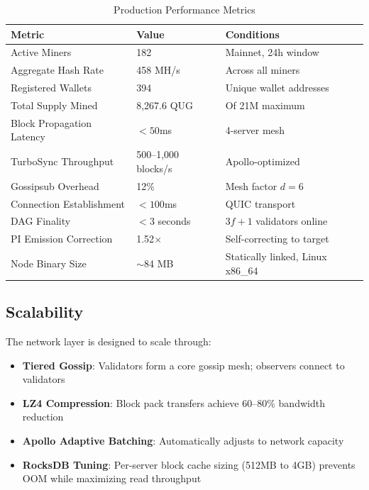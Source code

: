 \documentclass[11pt,a4paper]{article}
\begin{document}
\begin{table}[H]
\centering
\begin{tabular}{lll}
\toprule
\textbf{Metric} & \textbf{Value} & \textbf{Conditions} \\
\midrule
Active Miners & 182 & Mainnet, 24h window \\
Aggregate Hash Rate & 458 MH/s & Across all miners \\
Registered Wallets & 394 & Unique wallet addresses \\
Total Supply Mined & 8,267.6 QUG & Of 21M maximum \\
Block Propagation Latency & $< 50$ms & 4-server mesh \\
TurboSync Throughput & 500--1,000 blocks/s & Apollo-optimized \\
Gossipsub Overhead & 12\% & Mesh factor $d=6$ \\
Connection Establishment & $< 100$ms & QUIC transport \\
DAG Finality & $< 3$ seconds & $3f+1$ validators online \\
PI Emission Correction & 1.52$\times$ & Self-correcting to target \\
Node Binary Size & $\sim$84 MB & Statically linked, Linux x86\_64 \\
\bottomrule
\end{tabular}
\caption{Production Performance Metrics}
\end{table}

\subsection{Scalability}

The network layer is designed to scale through:

\begin{itemize}
    \item \textbf{Tiered Gossip}: Validators form a core gossip mesh; observers connect to validators
    \item \textbf{LZ4 Compression}: Block pack transfers achieve 60--80\% bandwidth reduction
    \item \textbf{Apollo Adaptive Batching}: Automatically adjusts to network capacity
    \item \textbf{RocksDB Tuning}: Per-server block cache sizing (512MB to 4GB) prevents OOM while maximizing read throughput
\end{itemize}

\end{document}
